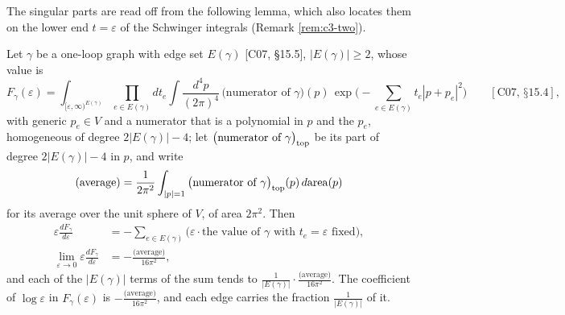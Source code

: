 The singular parts are read off from the following lemma, which also locates them on the lower end $t=\varepsilon$ of the Schwinger integrals (Remark \ref{rem:c3-two}).

\begin{lemma}
\label{lem:c5-log}
Let $\gamma$ be a one-loop graph with edge set $E(\gamma)$ [C07, §15.5], $|E(\gamma)|\ge2$, whose value is
\[
F_\gamma(\varepsilon)=\int_{[\varepsilon,\infty)^{E(\gamma)}}\prod_{e\in E(\gamma)}dt_e\int\frac{d^4p}{(2\pi)^4}\,\big(\text{numerator of }\gamma\big)(p)\,\exp\Big(-\sum_{e\in E(\gamma)}t_e|p+p_e|^2\Big)\qquad[\text{C07, §15.4}],
\]
with generic $p_e\in V$ and a numerator that is a polynomial in $p$ and the $p_e$, homogeneous of degree $2|E(\gamma)|-4$; let $\big(\text{numerator of }\gamma\big)_{\rm top}$ be its part of degree $2|E(\gamma)|-4$ in $p$, and write
\[
\text{(average)}=\frac1{2\pi^2}\int_{|p|=1}\big(\text{numerator of }\gamma\big)_{\rm top}(p)\,d\mathrm{area}(p)
\]
for its average over the unit sphere of $V$, of area $2\pi^2$. Then
\begin{equation}
\begin{aligned}
\varepsilon\frac{dF_\gamma}{d\varepsilon}&=-\sum_{e\in E(\gamma)}\big(\varepsilon\cdot\text{the value of }\gamma\text{ with }t_e=\varepsilon\text{ fixed}\big),\\
\lim_{\varepsilon\to0}\varepsilon\frac{dF_\gamma}{d\varepsilon}&=-\frac{\text{(average)}}{16\pi^2},
\end{aligned}
\label{eq:c5-log}
\end{equation}
and each of the $|E(\gamma)|$ terms of the sum tends to $\frac{1}{|E(\gamma)|}\cdot\frac{\text{(average)}}{16\pi^2}$. The coefficient of $\log\varepsilon$ in $F_\gamma(\varepsilon)$ is $-\frac{\text{(average)}}{16\pi^2}$, and each edge carries the fraction $\frac1{|E(\gamma)|}$ of it.
\end{lemma}


